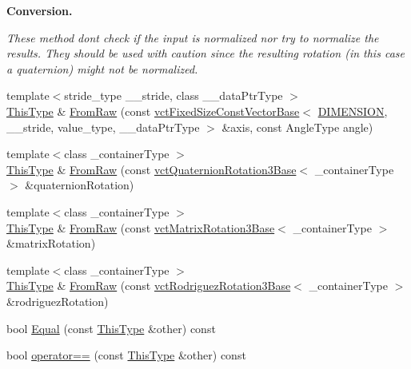 \begin{Indent}{\bf Conversion.}\par
{\em These method don\textquotesingle{}t check if the input is normalized nor try to normalize the results. They should be used with caution since the resulting rotation (in this case a quaternion) might not be normalized. }\begin{DoxyCompactItemize}
\item 
{\footnotesize template$<$stride\+\_\+type \+\_\+\+\_\+stride, class \+\_\+\+\_\+data\+Ptr\+Type $>$ }\\\hyperlink{classvct_axis_angle_rotation3_af654a8037b7b82a378f69cb1bfd9b8dd}{This\+Type} \& \hyperlink{classvct_axis_angle_rotation3_a220791aee1a43056534d744fe932aa0c}{From\+Raw} (const \hyperlink{classvct_fixed_size_const_vector_base}{vct\+Fixed\+Size\+Const\+Vector\+Base}$<$ \hyperlink{group__cisst_vector_gga278b4a98a62e4f5ff42ce055836240a9a778d22dfe29402d2cfdd381c1b870285}{D\+I\+M\+E\+N\+S\+I\+O\+N}, \+\_\+\+\_\+stride, value\+\_\+type, \+\_\+\+\_\+data\+Ptr\+Type $>$ \&axis, const Angle\+Type angle)
\item 
{\footnotesize template$<$class \+\_\+container\+Type $>$ }\\\hyperlink{classvct_axis_angle_rotation3_af654a8037b7b82a378f69cb1bfd9b8dd}{This\+Type} \& \hyperlink{classvct_axis_angle_rotation3_a86dd746e2ebc26d0773aaac3359fe98a}{From\+Raw} (const \hyperlink{classvct_quaternion_rotation3_base}{vct\+Quaternion\+Rotation3\+Base}$<$ \+\_\+container\+Type $>$ \&quaternion\+Rotation)
\item 
{\footnotesize template$<$class \+\_\+container\+Type $>$ }\\\hyperlink{classvct_axis_angle_rotation3_af654a8037b7b82a378f69cb1bfd9b8dd}{This\+Type} \& \hyperlink{classvct_axis_angle_rotation3_af2312e336196ae9e18d8380ec03035e4}{From\+Raw} (const \hyperlink{classvct_matrix_rotation3_base}{vct\+Matrix\+Rotation3\+Base}$<$ \+\_\+container\+Type $>$ \&matrix\+Rotation)
\item 
{\footnotesize template$<$class \+\_\+container\+Type $>$ }\\\hyperlink{classvct_axis_angle_rotation3_af654a8037b7b82a378f69cb1bfd9b8dd}{This\+Type} \& \hyperlink{classvct_axis_angle_rotation3_a9743ce2a4bf2b409ebaca2ab81d45d60}{From\+Raw} (const \hyperlink{classvct_rodriguez_rotation3_base}{vct\+Rodriguez\+Rotation3\+Base}$<$ \+\_\+container\+Type $>$ \&rodriguez\+Rotation)
\end{DoxyCompactItemize}
\end{Indent}
{\bf }\par
\begin{DoxyCompactItemize}
\item 
bool \hyperlink{classvct_axis_angle_rotation3_aec0f3161d774f905800a1952f20bcb54}{Equal} (const \hyperlink{classvct_axis_angle_rotation3_af654a8037b7b82a378f69cb1bfd9b8dd}{This\+Type} \&other) const 
\item 
bool \hyperlink{classvct_axis_angle_rotation3_a984a5e120d4c3bdc4ded5560a4b9f7b6}{operator==} (const \hyperlink{classvct_axis_angle_rotation3_af654a8037b7b82a378f69cb1bfd9b8dd}{This\+Type} \&other) const 
\end{DoxyCompactItemize}

